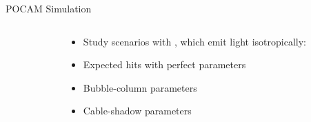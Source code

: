 
\begin{frame}[fragile]{POCAM Simulation}

  \begin{columns}
    \begin{column}{0.5\textwidth}
      \begin{overlayarea}{\textwidth}{\textheight}
        \vspace*{2cm}
      \end{overlayarea}
    \end{column}
    \begin{column}{0.5\textwidth}
      \begin{itemize}
        \item Study scenarios with , which emit light isotropically:
        \item Expected hits with perfect parameters
        \item Bubble-column parameters
        \item Cable-shadow parameters
      \end{itemize}

    \end{column}
  \end{columns}

\end{frame}